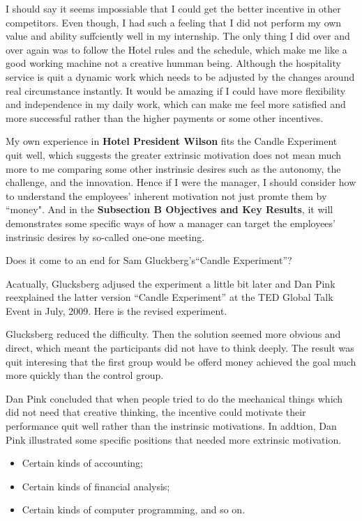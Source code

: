 \documentclass[12pt,onecolumn,a4paper]{IEEEtran}
\begin{document}
I should say it seems impossiable that I could get the better incentive in other competitors. Even though, I had such a feeling that I did not perform my own value and ability suffciently well in my internship. The only thing I did over and over again was to follow the Hotel rules and the schedule, which make me like a good working machine not a creative humman being. Although the hospitality service is quit a dynamic work which needs to be adjusted by the changes around real circumstance instantly. It would be amazing if I could have more flexibility and independence in my daily work, which can make me feel more satisfied and more successful rather than the higher payments or some other incentives. 

My own experience in \textbf{Hotel President Wilson} fits the Candle Experiment quit well, which suggests the greater extrinsic motivation does not mean much more to me comparing some other instrinsic desires such as the autonomy, the challenge, and the innovation. Hence if I were the manager, I should consider how to understand the employees' inherent motivation not just promte them by ``money". And in the \textbf{Subsection B Objectives and Key Results}, it will demonstrates some specific ways of how a manager can target the employees' instrinsic desires by so-called one-one meeting.

Does it come to an end for Sam Gluckberg's``Candle Experiment''? 

Acatually, Glucksberg adjused the experiment a little bit later and Dan Pink reexplained the latter version ``Candle Experiment'' at the TED Global Talk Event in July, 2009\cite{DanPink}. Here is the revised experiment.

Glucksberg reduced the difficulty. Then the solution seemed more obvious and direct, which meant the participants did not have to think deeply. The result was quit interesing that the first group would be offerd money achieved the goal much more quickly than the control group.

Dan Pink\cite{DanPink} concluded that when people tried to do the mechanical things which did not need that creative thinking, the incentive could motivate their performance quit well rather than the instrinsic motivations. In addtion, Dan Pink illustrated some specific positions\cite{DanPink} that needed more extrinsic motivation.

\begin{itemize}
  \item Certain kinds of accounting;
  \item Certain kinds of financial analysis;
  \item Certain kinds of computer programming, and so on.
\end{itemize}
\end{document}
